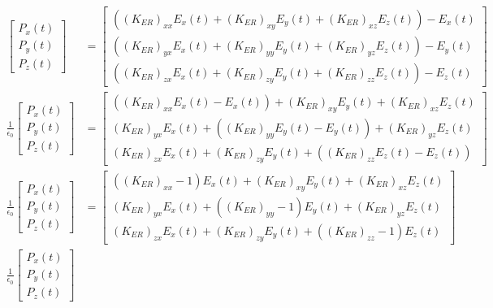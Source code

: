 \begin{itemize}
\begin{align*}
\begin{bmatrix}
        P_x(t) \\
        P_y(t) \\
        P_z(t)
      \end{bmatrix}
      &=
      \begin{bmatrix}
        \left((K_{ER})_{xx}E_x(t) + (K_{ER})_{xy}E_y(t) + (K_{ER})_{xz}E_z(t)\right) - E_x(t) \\
        \left((K_{ER})_{yx}E_x(t) + (K_{ER})_{yy}E_y(t) + (K_{ER})_{yz}E_z(t)\right) - E_y(t) \\
        \left((K_{ER})_{zx}E_x(t) + (K_{ER})_{zy}E_y(t) + (K_{ER})_{zz}E_z(t)\right) - E_z(t)
      \end{bmatrix} \\
      \frac{1}{\epsilon_0}\begin{bmatrix}
        P_x(t) \\
        P_y(t) \\
        P_z(t)
      \end{bmatrix}
      &=
      \begin{bmatrix}
        \left((K_{ER})_{xx}E_x(t) - E_x(t)\right) + (K_{ER})_{xy}E_y(t) + (K_{ER})_{xz}E_z(t) \\
        (K_{ER})_{yx}E_x(t) + \left((K_{ER})_{yy}E_y(t) - E_y(t)\right) + (K_{ER})_{yz}E_z(t) \\
        (K_{ER})_{zx}E_x(t) + (K_{ER})_{zy}E_y(t) + \left((K_{ER})_{zz}E_z(t) - E_z(t)\right)
      \end{bmatrix} \\
      \frac{1}{\epsilon_0}\begin{bmatrix}
        P_x(t) \\
        P_y(t) \\
        P_z(t)
      \end{bmatrix}
      &=
      \begin{bmatrix}
        \left((K_{ER})_{xx} - 1\right)E_x(t) + (K_{ER})_{xy}E_y(t) + (K_{ER})_{xz}E_z(t) \\
        (K_{ER})_{yx}E_x(t) + \left((K_{ER})_{yy} - 1 \right)E_y(t) + (K_{ER})_{yz}E_z(t) \\
        (K_{ER})_{zx}E_x(t) + (K_{ER})_{zy}E_y(t) + \left((K_{ER})_{zz} - 1\right)E_z(t)
      \end{bmatrix} \\
      \frac{1}{\epsilon_0}\begin{bmatrix}
        P_x(t) \\
        P_y(t) \\
        P_z(t)
      \end{bmatrix}

\end{align*}
\end{itemize}
